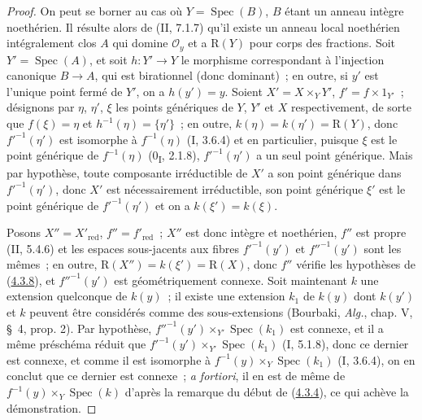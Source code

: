 \begin{proof}
On peut se borner au cas où $Y=\operatorname{Spec}(B)$, $B$ étant un anneau
intègre noethérien. Il résulte alors de (II, 7.1.7) qu'il existe un anneau
local noethérien intégralement clos $A$ qui domine $\mathcal O_y$ et a
$\mathrm R(Y)$ pour corps des fractions. Soit
$Y'=\operatorname{Spec}(A)$, et soit $h:Y'\to Y$ le morphisme correspondant
à l'injection canonique $B\to A$, qui est birationnel (donc dominant)~; en
outre, si $y'$ est l'unique point fermé de $Y'$, on a $h(y')=y$. Soient
$X'=X\times_YY'$, $f'=f\times1_{Y'}$~; désignons par $\eta$, $\eta'$,
$\xi$ les points génériques de $Y$, $Y'$ et $X$ respectivement, de sorte
que $f(\xi)=\eta$ et $h^{-1}(\eta)=\{\eta'\}$~; en outre,
$k(\eta)=k(\eta')=\mathrm R(Y)$, donc $f'^{-1}(\eta')$ est isomorphe à
$f^{-1}(\eta)$ (I, 3.6.4) et en particulier, puisque $\xi$ est le point
générique de $f^{-1}(\eta)$ (0\textsubscript{I}, 2.1.8),
$f'^{-1}(\eta')$ a un seul point générique. Mais par hypothèse, toute
composante irréductible de $X'$ a son point générique dans
$f'^{-1}(\eta')$, donc $X'$ est nécessairement irréductible, son point
générique $\xi'$ est le point générique de $f'^{-1}(\eta')$ et on a
$k(\xi')=k(\xi)$.


Posons $X''=X'_{\mathrm{red}}$, $f''=f'_{\mathrm{red}}$~; $X''$ est donc
intègre et noethérien, $f''$ est propre (II, 5.4.6) et les espaces
sous-jacents aux fibres $f'^{-1}(y')$ et $f''^{-1}(y')$ sont les mêmes~; en
outre, $\mathrm R(X'')=k(\xi')=\mathrm R(X)$, donc $f''$ vérifie les
hypothèses de (\hyperref[III.4.3.8-fr]{4.3.8}), et $f''^{-1}(y')$ est
géométriquement connexe. Soit maintenant $k$ une extension quelconque de
$k(y)$~; il existe une extension $k_1$ de $k(y)$ dont $k(y')$ et $k$ peuvent
être considérés comme des sous-extensions (Bourbaki, \emph{Alg.}, chap. V,
\S~4, prop. 2). Par hypothèse,
$f''^{-1}(y')\times_{Y'}\operatorname{Spec}(k_1)$ est connexe, et il a même
préschéma réduit que
$f'^{-1}(y')\times_{Y'}\operatorname{Spec}(k_1)$ (I, 5.1.8), donc ce dernier
est connexe, et comme il est isomorphe à
$f^{-1}(y)\times_Y\operatorname{Spec}(k_1)$ (I, 3.6.4), on en conclut que ce
dernier est connexe~; \emph{a fortiori}, il en est de même de
$f^{-1}(y)\times_Y\operatorname{Spec}(k)$ d'après la remarque du début de
(\hyperref[III.4.3.4-fr]{4.3.4}), ce qui achève la démonstration.
\end{proof}

